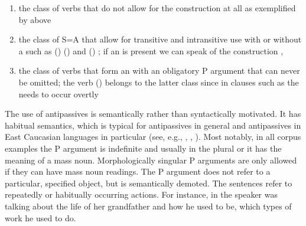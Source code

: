 \begin{enumerate}
	\item	the class of verbs that do not allow for the  construction at all as exemplified by  above
	\item	the class of S=A  that allow for transitive and intransitive use with or without a  such as  () ()  and  () ; if an   is present we can speak of the  construction , 
	\item	the class of verbs that form an  with an obligatory P argument that can never be omitted; the verb  ()  belongs to the latter class since in clauses such as  the  needs to occur overtly
\end{enumerate}

The use of antipassives is semantically rather than syntactically motivated. It has habitual semantics, which is typical for antipassives in general and antipassives in East Caucasian languages in particular  (see, e.g., \citealp{vandenBergManuscript}, \citealp{Tatevosov2011}, \citealp{ComrieEtAlXXXX}). Most notably, in all corpus examples the P argument is indefinite and usually in the plural or it has the meaning of a mass noun. Morphologically singular P arguments are only allowed if they can have mass noun readings. The P argument does not refer to a particular, specified object, but is semantically demoted. The sentences refer to repeatedly or habitually occurring actions. For instance, in  the speaker was talking about the life of her grandfather and how he used to be, which types of work he used to do.

